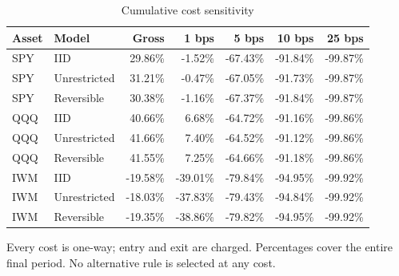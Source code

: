 \begin{table}[!htbp]\centering\small\setlength{\tabcolsep}{10pt}
\caption{Cumulative cost sensitivity}\label{tab:costs}
\begin{tabular}{llrrrrr}\toprule
Asset & Model & Gross & 1 bps & 5 bps & 10 bps & 25 bps\\\midrule
\mbox{SPY} & \mbox{IID} & \mbox{29.86\%} & \mbox{-1.52\%} & \mbox{-67.43\%} & \mbox{-91.84\%} & \mbox{-99.87\%}\\
\mbox{SPY} & \mbox{Unrestricted} & \mbox{31.21\%} & \mbox{-0.47\%} & \mbox{-67.05\%} & \mbox{-91.73\%} & \mbox{-99.87\%}\\
\mbox{SPY} & \mbox{Reversible} & \mbox{30.38\%} & \mbox{-1.16\%} & \mbox{-67.37\%} & \mbox{-91.84\%} & \mbox{-99.87\%}\\
\mbox{QQQ} & \mbox{IID} & \mbox{40.66\%} & \mbox{6.68\%} & \mbox{-64.72\%} & \mbox{-91.16\%} & \mbox{-99.86\%}\\
\mbox{QQQ} & \mbox{Unrestricted} & \mbox{41.66\%} & \mbox{7.40\%} & \mbox{-64.52\%} & \mbox{-91.12\%} & \mbox{-99.86\%}\\
\mbox{QQQ} & \mbox{Reversible} & \mbox{41.55\%} & \mbox{7.25\%} & \mbox{-64.66\%} & \mbox{-91.18\%} & \mbox{-99.86\%}\\
\mbox{IWM} & \mbox{IID} & \mbox{-19.58\%} & \mbox{-39.01\%} & \mbox{-79.84\%} & \mbox{-94.95\%} & \mbox{-99.92\%}\\
\mbox{IWM} & \mbox{Unrestricted} & \mbox{-18.03\%} & \mbox{-37.83\%} & \mbox{-79.43\%} & \mbox{-94.84\%} & \mbox{-99.92\%}\\
\mbox{IWM} & \mbox{Reversible} & \mbox{-19.35\%} & \mbox{-38.86\%} & \mbox{-79.82\%} & \mbox{-94.95\%} & \mbox{-99.92\%}\\
\bottomrule\end{tabular}
\par\smallskip\parbox{0.98\linewidth}{\footnotesize Every cost is one-way; entry and exit are charged. Percentages cover the entire final period. No alternative rule is selected at any cost.}
\end{table}

